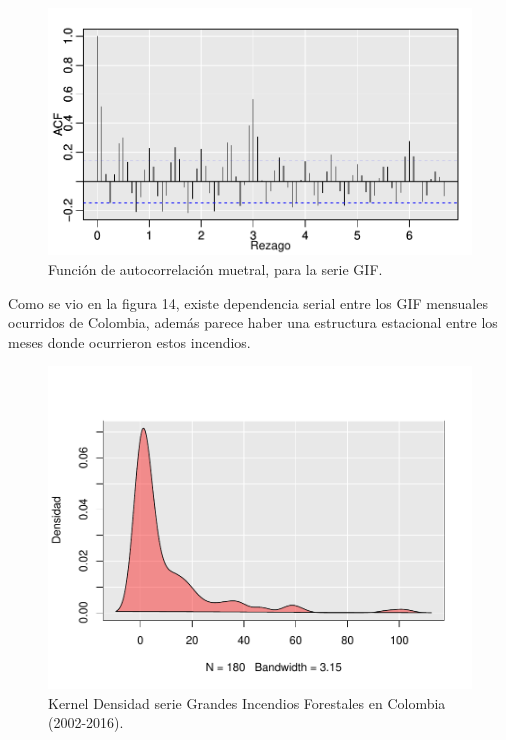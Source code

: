 \documentclass[a4paper]{article}\usepackage[]{graphicx}\usepackage[]{color}
\makeatletter
\def\maxwidth{ %
  \ifdim\Gin@nat@width>\linewidth
    \linewidth
  \else
    \Gin@nat@width
  \fi
}
\newenvironment{knitrout}{}{} %
\makeatother
\begin{document}
\begin{knitrout}
\color{fgcolor}\begin{figure}
\includegraphics[width=\maxwidth]{figure/unnamed-chunk-39-1} \caption[Función de autocorrelación muetral, para la serie GIF]{Función de autocorrelación muetral, para la serie GIF.}\label{fig:unnamed-chunk-39}
\end{figure}


\end{knitrout}

Como se vio en la figura 14, existe dependencia serial entre los GIF mensuales ocurridos de Colombia, además parece haber una estructura estacional entre los meses donde ocurrieron estos incendios. 

\begin{knitrout}
\color{fgcolor}\begin{figure}
\includegraphics[width=\maxwidth]{figure/unnamed-chunk-40-1} \caption[Kernel Densidad serie Grandes Incendios Forestales en Colombia (2002-2016)]{Kernel Densidad serie Grandes Incendios Forestales en Colombia (2002-2016).}\label{fig:unnamed-chunk-40}
\end{figure}


\end{knitrout}
\end{document}
